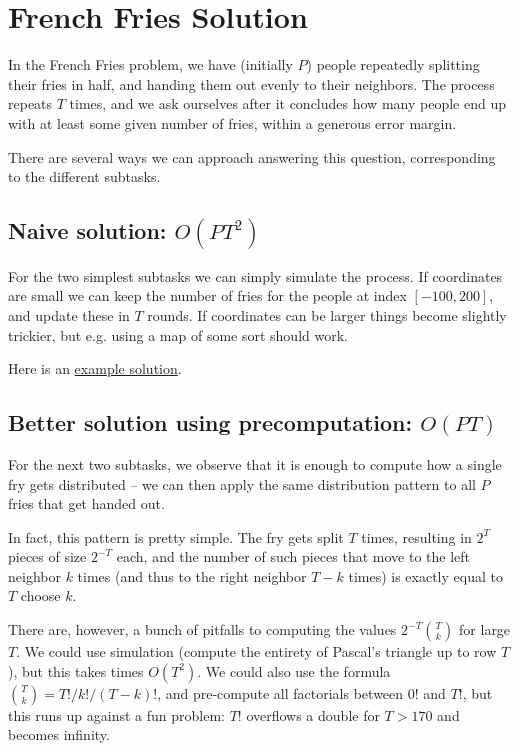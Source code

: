 \documentclass{article}
\begin{document}
\section*{French Fries Solution}
In the French Fries problem, we have (initially $P$) people repeatedly splitting their fries in half, and handing them out evenly to their neighbors.
The process repeats $T$ times, and we ask ourselves after it concludes how many people end up with at least some given number of fries, within a generous error margin.

There are several ways we can approach answering this question, corresponding to the different subtasks.

\subsection*{Naive solution: $O(PT^2)$}
For the two simplest subtasks we can simply simulate the process.
If coordinates are small we can keep the number of fries for the people at index $[-100, 200]$,
and update these in $T$ rounds.
If coordinates can be larger things become slightly trickier, but e.g. using a map of some sort should work.

Here is an \href{https://github.com/nordicolympiad/nordic-olympiad-2018/blob/master/tasks/fries/submissions/naive_map_mw.cpp}{example solution}.

\subsection*{Better solution using precomputation: $O(PT)$}
For the next two subtasks, we observe that it is enough to compute how a single fry gets distributed --
we can then apply the same distribution pattern to all $P$ fries that get handed out.

In fact, this pattern is pretty simple. The fry gets split $T$ times, resulting in $2^T$ pieces of size $2^{-T}$ each,
and the number of such pieces that move to the left neighbor $k$ times (and thus to the right neighbor $T - k$ times)
is exactly equal to $T$ choose $k$.

There are, however, a bunch of pitfalls to computing the values $2^{-T}\binom{T}{k}$ for large $T$.
We could use simulation (compute the entirety of Pascal's triangle up to row $T$), but this takes times $O(T^2)$.
We could also use the formula $\binom{T}{k} = T!/k!/(T-k)!$, and pre-compute all factorials between $0!$ and $T!$,
but this runs up against a fun problem: $T!$ overflows a double for $T > 170$ and becomes infinity.
\end{document}
